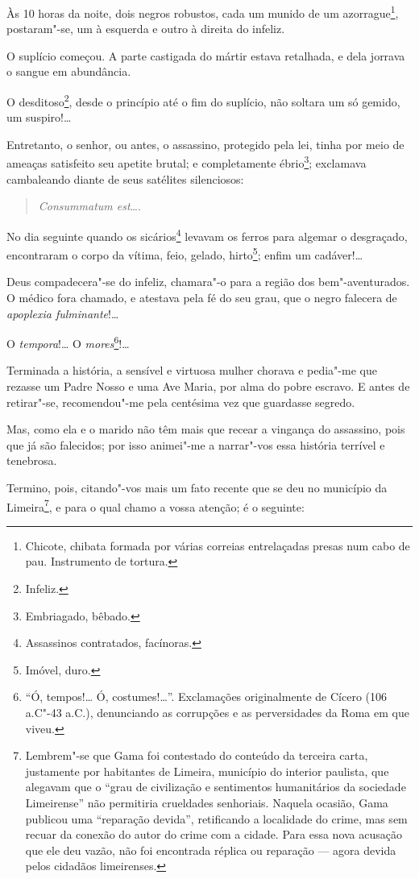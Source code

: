Às 10 horas da noite, dois negros robustos, cada um munido de um
azorrague\footnote{Chicote, chibata formada por várias correias
  entrelaçadas presas num cabo de pau. Instrumento de tortura.},
postaram"-se, um à esquerda e outro à direita do infeliz.

O suplício começou. A parte castigada do mártir estava retalhada, e dela
jorrava o sangue em abundância.

O desditoso\footnote{Infeliz.}, desde o princípio até o fim do
suplício, não soltara um só gemido, um suspiro!\ldots{}

Entretanto, o senhor, ou antes, o assassino, protegido pela lei, tinha
por meio de ameaças satisfeito seu apetite brutal; e completamente
ébrio\footnote{Embriagado, bêbado.}; exclamava cambaleando diante de
seus satélites silenciosos:

\begin{quote}
\emph{Consummatum est}\ldots{}.
\end{quote}

No dia seguinte quando os sicários\footnote{Assassinos contratados,
  facínoras.} levavam os ferros para algemar o desgraçado, encontraram o
corpo da vítima, feio, gelado, hirto\footnote{Imóvel, duro.}; enfim um
cadáver!\ldots{}

Deus compadecera"-se do infeliz, chamara"-o para a região dos
bem"-aventurados. O médico fora chamado, e atestava pela fé do seu grau,
que o negro falecera de \emph{apoplexia fulminante}!\ldots{}

O \emph{tempora}!\ldots{} O \emph{mores}\footnote{``Ó, tempos!\ldots{} Ó,
  costumes!\ldots{}''. Exclamações originalmente de Cícero (106 a.C"-43 a.C.),
  denunciando as corrupções e as perversidades da Roma em que viveu.}!\ldots{}

Terminada a história, a sensível e virtuosa mulher chorava e pedia"-me
que rezasse um Padre Nosso e uma Ave Maria, por alma do pobre escravo. E
antes de retirar"-se, recomendou"-me pela centésima vez que guardasse
segredo.

Mas, como ela e o marido não têm mais que recear a vingança do
assassino, pois que já são falecidos; por isso animei"-me a narrar"-vos
essa história terrível e tenebrosa.

Termino, pois, citando"-vos mais um fato recente que se deu no município
da Limeira\footnote{Lembrem"-se que Gama foi contestado do conteúdo da
  terceira carta, justamente por habitantes de Limeira, município do
  interior paulista, que alegavam que o ``grau de civilização e
  sentimentos humanitários da sociedade Limeirense'' não permitiria
  crueldades senhoriais. Naquela ocasião, Gama publicou uma ``reparação
  devida'', retificando a localidade do crime, mas sem recuar da conexão
  do autor do crime com a cidade. Para essa nova acusação que ele deu vazão,
  não foi encontrada réplica ou reparação --- agora devida pelos
  cidadãos limeirenses.}, e para o qual chamo a vossa atenção; é o
seguinte:

